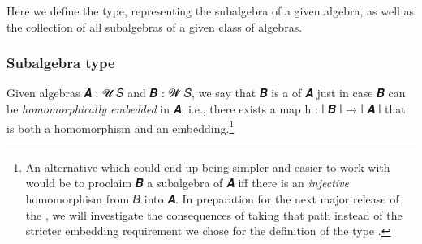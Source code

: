 Here we define the  type, representing the subalgebra of a given algebra, as well as the collection of all subalgebras of a given class of algebras.

\subsubsection{Subalgebra type}\label{subalgebra-type}

Given algebras \ab 𝑨 \as :  \ab 𝓤 \ab 𝑆 and \ab 𝑩 \as :  \ab 𝓦 \ab 𝑆, we say that \ab 𝑩 is a  of \ab 𝑨 just in case \ab 𝑩 can be \emph{homomorphically embedded} in \ab 𝑨; i.e., there exists a map \ab h \as : \af ∣ \ab 𝑩 \af ∣ \as → \af ∣ \ab 𝑨 \af ∣ that is both a homomorphism and an embedding.\footnote{%
An alternative which could end up being simpler and easier to work with would be to proclaim \ab 𝑩 a subalgebra of \ab 𝑨 iff there is an \emph{injective} homomorphism from \ab 𝐵 into \ab 𝑨.  In preparation for the next major release of the \ualib, we will investigate the consequences of taking that path instead of the stricter embedding requirement we chose for the definition of the type .}
\ccpad
